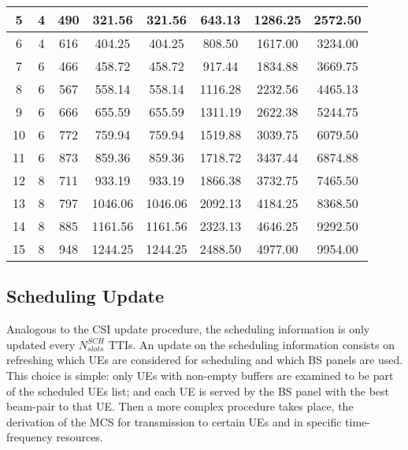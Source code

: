 \begin{table}[h]
\begin{tabular}{cccc|c|c|c|c|}
    \multicolumn{1}{|c|}{5}  & \multicolumn{1}{c|}{4} & \multicolumn{1}{c|}{490} & 321.56  & 321.56   & 643.13   & 1286.25  & 2572.50  \\ \hline
    \multicolumn{1}{|c|}{6}  & \multicolumn{1}{c|}{4} & \multicolumn{1}{c|}{616} & 404.25  & 404.25   & 808.50   & 1617.00  & 3234.00  \\ \hline
    \multicolumn{1}{|c|}{7}  & \multicolumn{1}{c|}{6} & \multicolumn{1}{c|}{466} & 458.72  & 458.72   & 917.44   & 1834.88  & 3669.75  \\ \hline
    \multicolumn{1}{|c|}{8}  & \multicolumn{1}{c|}{6} & \multicolumn{1}{c|}{567} & 558.14  & 558.14   & 1116.28  & 2232.56  & 4465.13  \\ \hline
    \multicolumn{1}{|c|}{9}  & \multicolumn{1}{c|}{6} & \multicolumn{1}{c|}{666} & 655.59  & 655.59   & 1311.19  & 2622.38  & 5244.75  \\ \hline
    \multicolumn{1}{|c|}{10} & \multicolumn{1}{c|}{6} & \multicolumn{1}{c|}{772} & 759.94  & 759.94   & 1519.88  & 3039.75  & 6079.50  \\ \hline
    \multicolumn{1}{|c|}{11} & \multicolumn{1}{c|}{6} & \multicolumn{1}{c|}{873} & 859.36  & 859.36   & 1718.72  & 3437.44  & 6874.88  \\ \hline
    \multicolumn{1}{|c|}{12} & \multicolumn{1}{c|}{8} & \multicolumn{1}{c|}{711} & 933.19  & 933.19   & 1866.38  & 3732.75  & 7465.50  \\ \hline
    \multicolumn{1}{|c|}{13} & \multicolumn{1}{c|}{8} & \multicolumn{1}{c|}{797} & 1046.06 & 1046.06  & 2092.13  & 4184.25  & 8368.50  \\ \hline
    \multicolumn{1}{|c|}{14} & \multicolumn{1}{c|}{8} & \multicolumn{1}{c|}{885} & 1161.56 & 1161.56  & 2323.13  & 4646.25  & 9292.50  \\ \hline
    \multicolumn{1}{|c|}{15} & \multicolumn{1}{c|}{8} & \multicolumn{1}{c|}{948} & 1244.25 & 1244.25  & 2488.50  & 4977.00  & 9954.00  \\ \hline
    \end{tabular}
\end{table}






\subsection{Scheduling Update}

Analogous to the CSI update procedure, the scheduling information is only updated every $N^{SCH}_{slots}$ TTIs. An update on the scheduling information consists on refreshing which UEs are considered for scheduling and which BS panels are used. This choice is simple: only UEs with non-empty buffers are examined to be part of the scheduled UEs list; and each UE is served by the BS panel with the best beam-pair to that UE. Then a more complex procedure takes place, the derivation of the MCS for transmission to certain UEs and in specific time-frequency resources.


